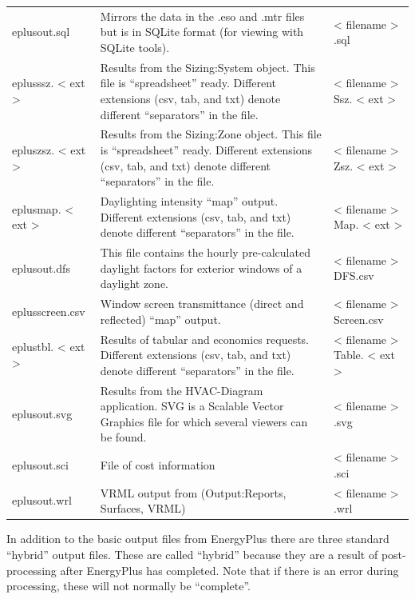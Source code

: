 \begin{longtable}[c]{p{1.5in}p{3.0in}p{1.5in}}
eplusout.sql & Mirrors the data in the .eso and .mtr files but is in SQLite format (for viewing with SQLite tools). & < filename > .sql \tabularnewline
eplusssz. < ext > & Results from the Sizing:System object. This file is “spreadsheet” ready. Different extensions (csv, tab, and txt) denote different “separators” in the file. & < filename > Ssz. < ext > \tabularnewline
epluszsz. < ext > & Results from the Sizing:Zone object. This file is “spreadsheet” ready. Different extensions (csv, tab, and txt) denote different “separators” in the file. & < filename > Zsz. < ext > \tabularnewline
eplusmap. < ext > & Daylighting intensity “map” output. Different extensions (csv, tab, and txt) denote different “separators” in the file. & < filename > Map. < ext > \tabularnewline
eplusout.dfs & This file contains the hourly pre-calculated daylight factors for exterior windows of a daylight zone. & < filename > DFS.csv \tabularnewline
eplusscreen.csv & Window screen transmittance (direct and reflected) “map” output. & < filename > Screen.csv \tabularnewline
eplustbl. < ext > & Results of tabular and economics requests. Different extensions (csv, tab, and txt) denote different “separators” in the file. & < filename > Table. < ext > \tabularnewline
eplusout.svg & Results from the HVAC-Diagram application. SVG is a Scalable Vector Graphics file for which several viewers can be found. & < filename > .svg \tabularnewline
eplusout.sci & File of cost information & < filename > .sci \tabularnewline
eplusout.wrl & VRML output from (Output:Reports, Surfaces, VRML) & < filename > .wrl \tabularnewline
\bottomrule
\end{longtable}

In addition to the basic output files from EnergyPlus there are three standard ``hybrid'' output files. These are called ``hybrid'' because they are a result of post-processing after EnergyPlus has completed. Note that if there is an error during processing, these will not normally be ``complete''.

